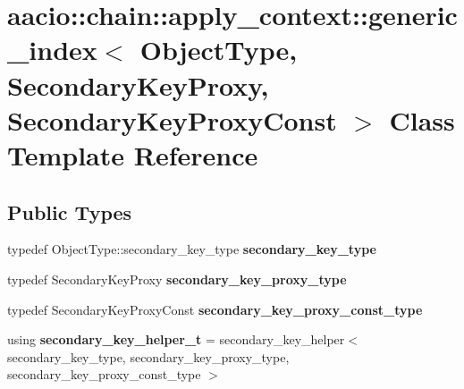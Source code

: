 \hypertarget{classaacio_1_1chain_1_1apply__context_1_1generic__index}{}\section{aacio\+:\+:chain\+:\+:apply\+\_\+context\+:\+:generic\+\_\+index$<$ Object\+Type, Secondary\+Key\+Proxy, Secondary\+Key\+Proxy\+Const $>$ Class Template Reference}
\label{classaacio_1_1chain_1_1apply__context_1_1generic__index}
\subsection*{Public Types}
\begin{DoxyCompactItemize}
\item 
\mbox{\label{classaacio_1_1chain_1_1apply__context_1_1generic__index_a576f7c17ea392a9da116f6f8f4f3c077}} 
typedef Object\+Type\+::secondary\+\_\+key\+\_\+type {\bfseries secondary\+\_\+key\+\_\+type}
\item 
\mbox{\label{classaacio_1_1chain_1_1apply__context_1_1generic__index_ab1cc41e03134034823ed3fe9ccc55b43}} 
typedef Secondary\+Key\+Proxy {\bfseries secondary\+\_\+key\+\_\+proxy\+\_\+type}
\item 
\mbox{\label{classaacio_1_1chain_1_1apply__context_1_1generic__index_a3e2df0db01bc827a44b0b96e0fdab36a}} 
typedef Secondary\+Key\+Proxy\+Const {\bfseries secondary\+\_\+key\+\_\+proxy\+\_\+const\+\_\+type}
\item 
\mbox{\label{classaacio_1_1chain_1_1apply__context_1_1generic__index_ac655ae1dc18ca2357ea35c295880507e}} 
using {\bfseries secondary\+\_\+key\+\_\+helper\+\_\+t} = secondary\+\_\+key\+\_\+helper$<$ secondary\+\_\+key\+\_\+type, secondary\+\_\+key\+\_\+proxy\+\_\+type, secondary\+\_\+key\+\_\+proxy\+\_\+const\+\_\+type $>$
\end{DoxyCompactItemize}

